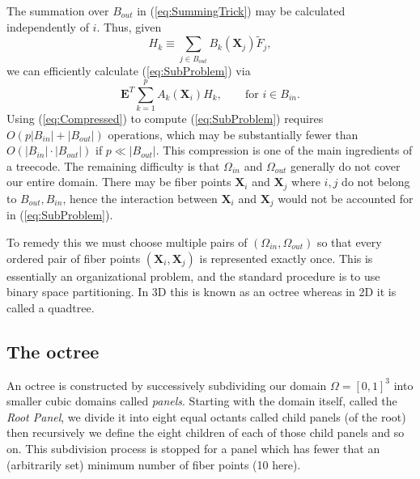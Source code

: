 \documentclass[preprint,12pt]{elsarticle}
\newcommand{\full}{\displaystyle}
\newcommand{\B}[1]{\mathbf{#1}}
\begin{document}
The summation over $B_{out}$ in (\ref{eq:SummingTrick}) may be calculated independently of $i$. Thus, given
\begin{equation}
H_k \equiv \sum_{j\in B_{out}} B_k(\B{X}_j) \tilde{F}_j,
\label{eq:CombinedFarField}
\end{equation}
we can efficiently calculate (\ref{eq:SubProblem}) via
\begin{equation}
\B{E}^T\full\sum_{k=1}^{p}A_k(\B{X}_i)H_k, \qquad\text{for $i\in B_{in}$}.
\label{eq:Compressed}
\end{equation}
Using (\ref{eq:Compressed}) to compute (\ref{eq:SubProblem}) requires $O(p|B_{in}| + |B_{out}|)$ operations, which may be substantially fewer than $O(|B_{in}|\cdot |B_{out}|)$ if $p\ll |B_{out}|$. This compression is one of the main ingredients of a treecode. The remaining difficulty is that $\Omega_{in}$ and $\Omega_{out}$ generally do not cover our entire domain. There may be fiber points $\B{X}_i$ and $\B{X}_j$ where $i,j$ do not belong to $B_{out},B_{in}$, hence the interaction between $\B{X}_i$ and $\B{X}_j$ would not be accounted for in (\ref{eq:SubProblem}).

To remedy this we must choose multiple pairs of $\left(\Omega_{in},\Omega_{out}\right)$ so that every ordered pair of fiber points $\left(\B{X}_i, \B{X}_j\right)$ is represented exactly once. This is essentially an organizational problem, and the standard procedure is to use binary space partitioning. In 3D this is known as an octree whereas in 2D  it is called a quadtree.

\subsection{The octree}
An octree is constructed by successively subdividing our domain $\Omega = [0,1]^3$ into smaller cubic domains called {\em panels}. 
Starting with the domain itself, called the {\em Root Panel},  we divide it into eight equal octants called child panels (of the root)
then recursively we define the eight children of each of those child panels and so on. This subdivision process is stopped for a panel which has fewer that an (arbitrarily set) minimum number of fiber points (10 here). 
\end{document}
